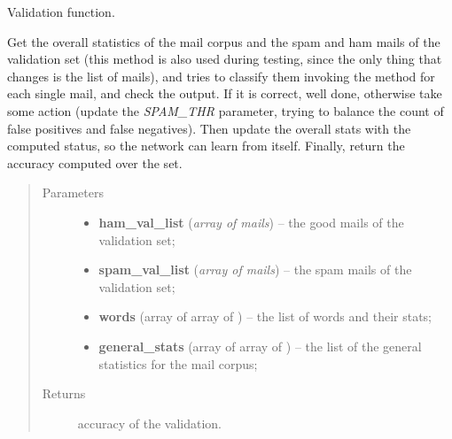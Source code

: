 \documentclass[letterpaper,10pt,english]{sphinxmanual}
\begin{document}
\begin{fulllineitems}

\begin{fulllineitems}
\label{index:naive_bayes.Bayes.validate}
Validation function.

Get the overall statistics of the mail corpus and the spam and ham
mails of the validation set (this method is also used during testing,
since the only thing that changes is the list of mails), and tries to
classify them invoking the {\hyperref[index:classifier.Classifier.classify]{}} method
for each single mail, and check the output. If it is correct, well done,
otherwise take some action (update the \emph{SPAM\_THR} parameter, trying to
balance the count of false positives and false negatives). Then update
the overall stats with the computed status, so the network can learn
from itself. Finally, return the accuracy computed over the set.
\begin{quote}\begin{description}
\item[{Parameters}] \leavevmode\begin{itemize}
\item {} 
\textbf{ham\_val\_list} (\emph{array of mails}) -- the good mails of the validation set;

\item {} 
\textbf{spam\_val\_list} (\emph{array of mails}) -- the spam mails of the validation set;

\item {} 
\textbf{words} (array of array of {\hyperref[index:gen_stat.Word]{}}) -- the list of words and their stats;

\item {} 
\textbf{general\_stats} (array of array of {\hyperref[index:gen_stat.Stat]{}}) -- the list of the general statistics for the mail corpus;

\end{itemize}

\item[{Returns}] \leavevmode
accuracy of the validation.

\end{description}\end{quote}

\end{fulllineitems}


\end{fulllineitems}
\end{document}
